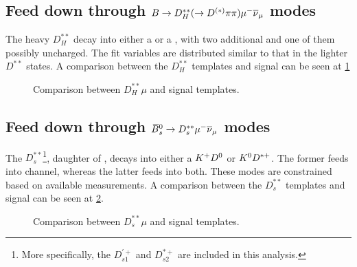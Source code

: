 \subsection{Feed down through $B \rightarrow D_H^{**}(\rightarrow D^{(*)}\pi\pi){\mu^-}{{\overline{\nu}}_\mu}$ modes}

The heavy $D_H^{**}$ decay into either a \Dz or a \Dstar, with two additional
\pion and one of them possibly uncharged.
The fit variables are distributed similar to that in the lighter
$D^{**}$ states.
A comparison between the $D_H^{**}$ templates and \Dz\taum signal can be
seen at \ref{fig:dstst-heavy-vs-d0-sig}

\begin{figure}[!htb]

    \caption{Comparison between $D_H^{**}\mu$ and \Dz\taum signal templates.}
    \label{fig:dstst-heavy-vs-d0-sig}
\end{figure}


\subsection{Feed down through ${{\kern 0.18em\overline{\kern -0.18em B}}{}^0_{s}} \rightarrow D_s^{**}{\mu^-}{{\overline{\nu}}_\mu}$ modes}

The $D_s^{**}$\footnote{
    More specifically, the $D_{s1}^{'+}$ and $D_{s2}^{*+}$ are included in
    this analysis.
}, daughter of \Bsb, decays into either a ${{K}^+}{{D}^0}$ or ${{K}^0}{{D}^{*+}}$.
The former feeds into \Dz channel, whereas the latter feeds into both.
These modes are constrained based on available measurements.
A comparison between the $D_s^{**}$ templates and \Dz\taum signal can be
seen at \cref{fig:d_s-vs-d0-sig}.

\begin{figure}[!htb]

    \caption{Comparison between $D_s^{**}\mu$ and \Dz\taum signal templates.}
    \label{fig:d_s-vs-d0-sig}
\end{figure}


